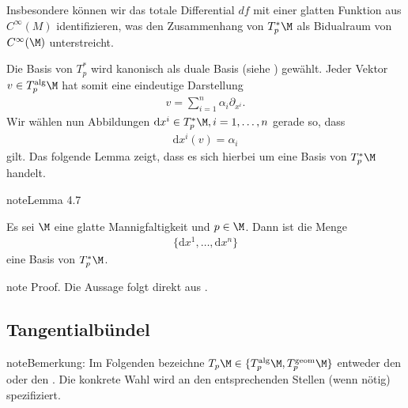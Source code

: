 \documentclass[letterpaper,10pt,german]{jupyterBook}
\begin{document}
\sphinxAtStartPar
Insbesondere können wir das totale Differential \(df\) mit einer glatten Funktion aus \(C^\infty(M)\) identifizieren, was den Zusammenhang von \(T^\ast_p \M\) als Bidualraum von \(C^\infty(\M)\) unterstreicht.

\sphinxAtStartPar
Die Basis von \(T^\ast_p\) wird kanonisch als duale Basis (siehe {\hyperref[\detokenize{vektoranalysis/multilinear:lem:dualeBasis}]{}}) gewählt.
Jeder Vektor \(v\in T_p^{\text{alg}}\M\) hat somit eine eindeutige Darstellung
\begin{equation*}
\begin{split}v = \sum_{i=1}^n \alpha_i \partial_{x^i}.\end{split}
\end{equation*}
\sphinxAtStartPar
Wir wählen nun Abbildungen \(\mathrm{d}x^i\in T^\ast_p\M, i=1,\ldots,n\) gerade so, dass
\begin{equation*}
\begin{split}\mathrm{d}x^i(v) = \alpha_i\end{split}
\end{equation*}
\sphinxAtStartPar
gilt.
Das folgende Lemma zeigt, dass es sich hierbei um eine Basis von \(T^\ast_p\M\) handelt.
\label{manifolds/tangential:lemma-18}
\begin{sphinxadmonition}{note}{Lemma 4.7}



\sphinxAtStartPar
Es sei \(\M\) eine glatte Mannigfaltigkeit und \(p\in\M\).
Dann ist die Menge
\begin{equation*}
\begin{split}\{\mathrm{d}x^1,\ldots, \mathrm{d}x^n\}\end{split}
\end{equation*}
\sphinxAtStartPar
eine Basis von \(T_p^\ast\M\).
\end{sphinxadmonition}

\begin{sphinxadmonition}{note}
\sphinxAtStartPar
Proof. Die Aussage folgt direkt aus {\hyperref[\detokenize{vektoranalysis/multilinear:lem:dualeBasis}]{}}.
\end{sphinxadmonition}


\subsection{Tangentialbündel}
\label{\detokenize{manifolds/tangential:tangentialbundel}}
\begin{sphinxadmonition}{note}{Bemerkung:}
\sphinxAtStartPar
Im Folgenden bezeichne \(T_p\M\in\{T^{\text{alg}}_p\M, T^{\text{geom}}_p\M \}\) entweder den  oder den .
Die konkrete Wahl wird an den entsprechenden Stellen (wenn nötig) spezifiziert.
\end{sphinxadmonition}
\end{document}
